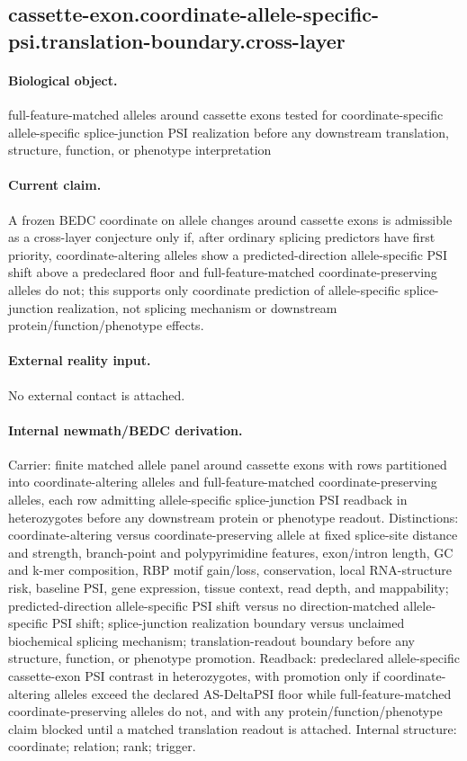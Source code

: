 \subsection{cassette-exon.coordinate-allele-specific-psi.translation-boundary.cross-layer}

\paragraph{Biological object.} full-feature-matched alleles around cassette exons tested for coordinate-specific allele-specific splice-junction PSI realization before any downstream translation, structure, function, or phenotype interpretation

\paragraph{Current claim.} A frozen BEDC coordinate on allele changes around cassette exons is admissible as a cross-layer conjecture only if, after ordinary splicing predictors have first priority, coordinate-altering alleles show a predicted-direction allele-specific PSI shift above a predeclared floor and full-feature-matched coordinate-preserving alleles do not; this supports only coordinate prediction of allele-specific splice-junction realization, not splicing mechanism or downstream protein/function/phenotype effects.

\paragraph{External reality input.}
No external contact is attached.

\paragraph{Internal newmath/BEDC derivation.} Carrier: finite matched allele panel around cassette exons with rows partitioned into coordinate-altering alleles and full-feature-matched coordinate-preserving alleles, each row admitting allele-specific splice-junction PSI readback in heterozygotes before any downstream protein or phenotype readout. Distinctions: coordinate-altering versus coordinate-preserving allele at fixed splice-site distance and strength, branch-point and polypyrimidine features, exon/intron length, GC and k-mer composition, RBP motif gain/loss, conservation, local RNA-structure risk, baseline PSI, gene expression, tissue context, read depth, and mappability; predicted-direction allele-specific PSI shift versus no direction-matched allele-specific PSI shift; splice-junction realization boundary versus unclaimed biochemical splicing mechanism; translation-readout boundary before any structure, function, or phenotype promotion. Readback: predeclared allele-specific cassette-exon PSI contrast in heterozygotes, with promotion only if coordinate-altering alleles exceed the declared AS-DeltaPSI floor while full-feature-matched coordinate-preserving alleles do not, and with any protein/function/phenotype claim blocked until a matched translation readout is attached. Internal structure: coordinate; relation; rank; trigger.

